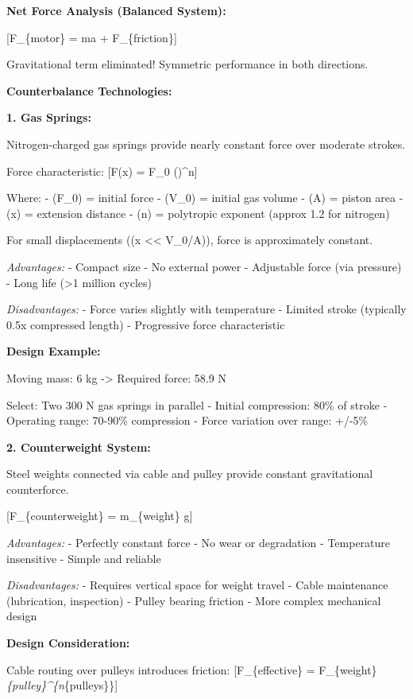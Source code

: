 \documentclass[
]{article}
\begin{document}
\textbf{Net Force Analysis (Balanced System):}

{[}F\_\{motor\} = ma + F\_\{friction\}{]}

Gravitational term eliminated! Symmetric performance in both directions.

\textbf{Counterbalance Technologies:}

\textbf{1. Gas Springs:}

Nitrogen-charged gas springs provide nearly constant force over moderate
strokes.

Force characteristic: {[}F(x) = F\_0
\left(\right)\^{}n{]}

Where: - (F\_0) = initial force - (V\_0) = initial gas volume - (A) =
piston area - (x) = extension distance - (n) = polytropic exponent
(approx 1.2 for nitrogen)

For small displacements ((x \textless\textless{} V\_0/A)), force is
approximately constant.

\emph{Advantages:} - Compact size - No external power - Adjustable force
(via pressure) - Long life (\textgreater1 million cycles)

\emph{Disadvantages:} - Force varies slightly with temperature - Limited
stroke (typically 0.5x compressed length) - Progressive force
characteristic

\textbf{Design Example:}

Moving mass: 6 kg -\textgreater{} Required force: 58.9 N

Select: Two 300 N gas springs in parallel - Initial compression: 80\% of
stroke - Operating range: 70-90\% compression - Force variation over
range: +/-5\%

\textbf{2. Counterweight System:}

Steel weights connected via cable and pulley provide constant
gravitational counterforce.

{[}F\_\{counterweight\} = m\_\{weight\} \times g{]}

\emph{Advantages:} - Perfectly constant force - No wear or degradation -
Temperature insensitive - Simple and reliable

\emph{Disadvantages:} - Requires vertical space for weight travel -
Cable maintenance (lubrication, inspection) - Pulley bearing friction -
More complex mechanical design

\textbf{Design Consideration:}

Cable routing over pulleys introduces friction: {[}F\_\{effective\} =
F\_\{weight\} \times \eta\emph{\{pulley\}\^{}\{n}\{pulleys\}\}{]}
\end{document}
